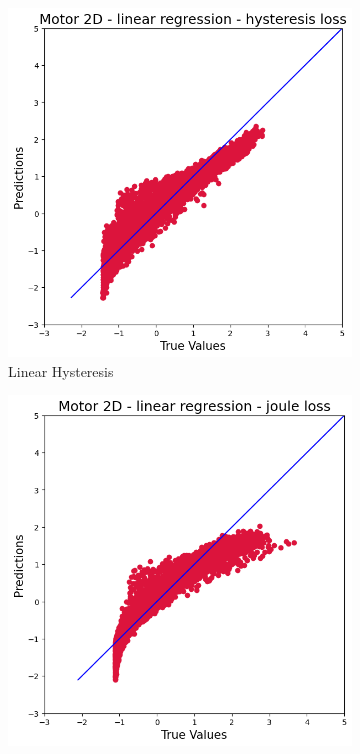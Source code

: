 \documentclass{article}
\begin{document}
\begin{figure}[!htbp]
    \centering
    \begin{subfigure}[b]{0.23\textwidth}
        \centering
        \includegraphics[width=\textwidth]{images/2D/linear_hysteresis.png}
        \caption{Linear Hysteresis}
    \end{subfigure}
    \hfill
    \begin{subfigure}[b]{0.23\textwidth}
        \centering
        \includegraphics[width=\textwidth]{images/2D/linear_joule.png}

\end{subfigure}
\end{figure}
\end{document}
